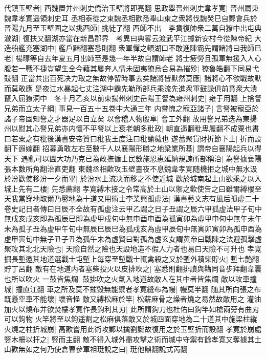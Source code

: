 代鎮玉壁者|{
	西魏置并州刺史僑治玉壁將即亮翻}
思政舉晉州刺史韋孝寛|{
	晉州屬東魏韋孝寛遥領刺史耳}
丞相泰從之東魏丞相歡悉舉山東之衆將伐魏癸巳自鄴會兵於晉陽九月至玉壁圍之以挑西師|{
	挑徒了翻}
西師不出　李賁復帥衆二萬自獠中出屯典澈湖|{
	復扶又翻湖亦當在新昌郡界　考異曰典畧云渡武平江據新安村今從陳帝紀}
大造船艦充塞湖中|{
	艦戶黯翻塞悉則翻}
衆軍憚之頓湖口不敢進陳霸先謂諸將曰我師已老|{
	楊㬓等自去年夏五月出師至是幾一年半故自謂師老}
將士疲勞且孤軍無援入人心腹若一戰不捷豈望生全今藉其屢奔人情未固夷獠烏合易為摧殄|{
	獠魯皓翻下同易弋豉翻}
正當共出百死决力取之無故停留時事去矣諸將皆默然莫應|{
	諸將心不欲戰故默而莫敢應}
是夜江水暴起七丈注湖中霸先勒所部兵乘流先進衆軍鼓譟俱前賁衆大潰竄入屈獠洞中　冬十月乙亥以前東揚州刺史岳陽王詧為雍州刺史|{
	雍于用翻}
上捨詧兄弟而立太子綱|{
	事見一百五十五卷中大通三年}
内嘗愧之寵亞諸子|{
	言詧被寵亞於諸子帝固知詧之才器足以自立矣}
以會稽人物殷阜|{
	會工外翻}
故用詧兄弟迭為東揚州以慰其心詧兄弟亦内懷不平詧以上衰老朝多秕政|{
	朝直遥翻秕卑履翻不成粟也書曰若粟之有秕後漢書安帝贊曰秕我王度注曰秕諭穢也}
遂蓄聚貨財折節下士|{
	折而設翻下遐嫁翻}
招募勇敢左右至數千人以襄陽形勝之地梁業所基|{
	謂帝自襄陽起兵以得天下}
遇亂可以圖大功乃克已為政撫循士民數施恩惠延納規諫所部稱治|{
	為詧據襄陽張本數所角翻治直吏翻}
東魏丞相歡攻玉壁晝夜不息魏韋孝寛随機拒之城中無水汲於汾歡使移汾一夕而畢|{
	於汾水上流决而移之不使近城}
歡於城南起土山欲乘之以入城上先有二樓|{
	先悉薦翻}
孝寛縛木接之令常高於土山以禦之歡使告之曰雖爾縛樓至天我當穿地取爾乃鑿地為十道又用術士李業興孤虚法|{
	漢書藝文志有風后孤虚二十卷史記日者傳曰日辰不全故有孤虚注云甲乙謂之日子丑謂之辰六甲孤虚法甲子旬中無戌亥戌亥即為孤辰巳即為虚甲戍旬中無申酉申酉為孤寅卯為虛甲申旬中無午未午未為孤子丑為虚甲午旬中無辰巳辰巳為孤戍亥為虛甲辰旬中無寅卯寅卯為孤申酉為虛甲寅旬中無子丑子丑為孤午未為虚賢曰對孤為虚玄女謂黄帝曰戰陳之法避孤擊虚}
聚攻其北北天險也|{
	天險自然之險也天設地造不假人力者也易曰天險不可升也}
孝寛掘長塹邀其地道選戰士屯塹上每穿至塹戰士輒禽殺之又於塹外積柴貯火|{
	塹七艶翻貯丁呂翻}
敵有在地道内者塞柴投火以皮排吹之|{
	塞悉則翻排讀與鞲同音步拜翻韋囊也所以吹火}
一鼓皆焦爛|{
	鼓排吹之火氣入地道故敵人在其中者皆焦爛}
敵以攻車撞城|{
	撞直江翻}
車之所及莫不摧毁無能禦者孝寛縫布為幔|{
	幔莫半翻}
随其所向張之布既懸空車不能壞|{
	壞音怪}
敵又縛松麻於竿|{
	松薪麻骨之燥者燒之易然故敵用之}
灌油加火以燒布并欲焚樓孝寛作長鉤利其刃|{
	此所謂鉤刀也杜佑曰鉤竿如槍兩旁有曲刃可以鉤物}
火竿將至以鉤遥割之松麻俱落敵又於城四面穿地為二十道其中施梁柱縱火燒之柱折城崩|{
	高歡嘗用此術攻鄴以擒劉誕故復用之於玉壁折而設翻}
孝寛於崩處竪木柵以扞之|{
	竪而主翻}
敵不得入城外盡攻擊之術而城中守禦有餘孝寛又奪據其土山歡無如之何乃使倉曹參軍祖珽說之曰|{
	珽他鼎翻說式芮翻}
